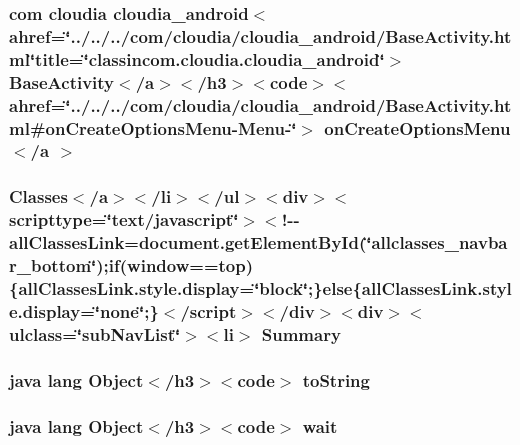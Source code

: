 \hypertarget{_cloudia_activity_8html_a624d351f7879c37d4dbd43acf019df6c}{
\subsubsection[{on\-Create\-Options\-Menu$<$/a $>$}]{\setlength{\rightskip}{0pt plus 5cm}com cloudia cloudia\-\_\-android$<$ahref=\char`\"{}../../../com/cloudia/cloudia\-\_\-android/Base\-Activity.\-html\char`\"{}title=\char`\"{}classincom.\-cloudia.\-cloudia\-\_\-android\char`\"{}$>$ Base\-Activity$<$/{\bf a}$>$$<$/h3$>$$<$code$>$$<$ahref=\char`\"{}../../../com/cloudia/cloudia\-\_\-android/Base\-Activity.\-html\#{\bf on\-Create\-Options\-Menu}-\/Menu-\/\char`\"{}$>$ on\-Create\-Options\-Menu$<$/{\bf a} $>$}}\label{_cloudia_activity_8html_a624d351f7879c37d4dbd43acf019df6c}
\hypertarget{_cloudia_activity_8html_a6f9ab45abc9b0679dc1b132fbacfc681}{
\subsubsection[{Summary}]{\setlength{\rightskip}{0pt plus 5cm}Classes$<$/{\bf a}$>$$<$/li$>$$<$/ul$>$$<$div$>$$<$scripttype=\char`\"{}text/javascript\char`\"{}$>$$<$!-\/-\/all\-Classes\-Link=document.\-get\-Element\-By\-Id(\char`\"{}allclasses\-\_\-navbar\-\_\-bottom\char`\"{});if(window==top)\{all\-Classes\-Link.\-style.\-display=\char`\"{}block\char`\"{};\}else\{all\-Classes\-Link.\-style.\-display=\char`\"{}none\char`\"{};\}$<$/script$>$$<$/div$>$$<$div$>$$<$ulclass=\char`\"{}sub\-Nav\-List\char`\"{}$>$$<$li$>$ Summary}}\label{_cloudia_activity_8html_a6f9ab45abc9b0679dc1b132fbacfc681}
\hypertarget{_cloudia_activity_8html_a36e8a76a4132c9a7081416f27d087615}{
\subsubsection[{to\-String}]{\setlength{\rightskip}{0pt plus 5cm}java lang Object$<$/h3$>$$<$code$>$ to\-String}}\label{_cloudia_activity_8html_a36e8a76a4132c9a7081416f27d087615}
\hypertarget{_cloudia_activity_8html_a9a9f0c22e5688d478c707f910f1c1aea}{
\subsubsection[{wait}]{\setlength{\rightskip}{0pt plus 5cm}java lang Object$<$/h3$>$$<$code$>$ wait}}\label{_cloudia_activity_8html_a9a9f0c22e5688d478c707f910f1c1aea}
